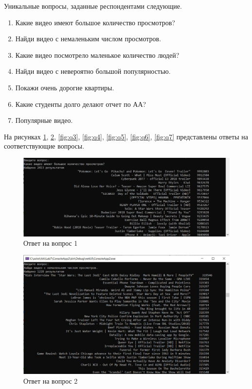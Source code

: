 Уникальные вопросы, заданные респондентами следующие.
\begin{enumerate}
	\item Какие видео имеют большое количество просмотров?
	\item Найди видео с немаленьким числом просмотров.
	\item Какие видео посмотрело маленькое количество людей?
	\item Найди видео с невероятно большой популярностью.
	\item Покажи очень дорогие квартиры. 
	\item Какие студенты долго делают отчет по АА?
	\item Популярные видео.
\end{enumerate}

На рисунках \ref{fig:q1}, \ref{fig:q2}, \ref{fig:q3}, \ref{fig:q4}, \ref{fig:q5}, \ref{fig:q6}, \ref{fig:q7} представлены ответы на соответствующие вопросы.
\captionsetup{justification=centering,singlelinecheck=false}
\begin{figure}[H]
	\centering
	\includegraphics[width=1\linewidth]{inc/img/q1}
	\caption{Ответ на вопрос 1}
	\label{fig:q1}
\end{figure}
\begin{figure}[H]
	\centering
	\includegraphics[width=1\linewidth]{inc/img/q2}
	\caption{Ответ на вопрос 2}
	\label{fig:q2}
\end{figure}
